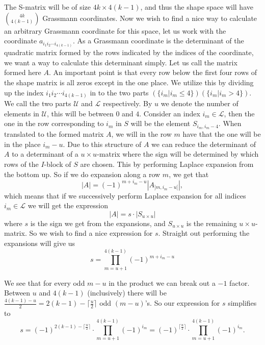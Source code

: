 \documentclass[a4paper,12pt]{book}
\theoremstyle{plain}
\theoremstyle{definition}
\begin{document}
The S-matrix will be of size \( 4k \times 4(k-1) \), and thus the shape space
will have  \( {4k \choose 4(k-1)} \) Grassmann coordinates. Now we wish to
find a nice way to calculate an arbitrary Grassmann coordinate for this space,
let us work with the coordinate \( a_{i_1 i_2 \cdots i_{4(k-1)}} \). As a
Grassmann coordinate is the determinant of the quadratic matrix formed by the
rows indicated by the  indices of the coordinate, we want a way to calculate
this determinant simply. Let us call the matrix formed  here \( A \). An
important point is that every row below the first four rows of the shape
matrix is all zeros except in the one place.
We utilize this by dividing up the index \( i_1 i_2 \cdots i_{4(k-1)} \) in to
the two parts \( (\{i_m | i_m \leq 4\})(\{i_m | i_m > 4\}) \). We call the two
parts \( \mathcal{U} \) and \( \mathcal{L} \) respectively. By \( u \) we
denote the number of elements in \( \mathcal{U} \), this will be between \( 0
\) and \( 4 \).
Consider an index \( i_m \in \mathcal{L} \), then the one in the row
corresponding to \( i_m \) in \( S \) will be the element \( S_{i_m, i_m - 4}
\). When translated to the formed matrix \( A \), we will in the row \( m \)
have that the one will be in the place \( i_m - u\). Due to this structure of
\( A \) we can reduce the determinant of \( A \) to a determinant of a \( u
\times u \)-matrix where the sign will be determined by which rows of the \( I
\)-block of \( S \) are chosen. This by performing Laplace expansion from the
bottom up. So if we do expansion along a row \( m \), we get that
\[
	|A| = (-1)^{m + i_m - u}|A_{]m, i_m - u[}|,
\]
which means that if we successively perform Laplace expansion for all indices
\( i_m \in \mathcal{L} \) we will get the expression
\[
	|A| = s \cdot |S_{u \times u}|
\]
where \( s \) is the sign we get from the expansions,
and \( S_{u \times u} \) is the remaining \( u \times u \)-matrix.
So we wish to find a nice expression for \( s \).
Straight out performing the expansions will give us
\[
	s = \prod_{m = u + 1}^{4(k-1)} (-1)^{m + i_m - u}
\]

We see that for every odd \( m - u \) in the product we can break out a \( -1
\) factor. Between \( u \) and \( 4(k-1) \) (inclusively) there will be \(
\frac{4(k-1) - u}{2} = 2(k-1) - \lceil \frac{u}{2} \rceil \) odd \( (m - u)
\)'s. So our expression for \( s \) simplifies to
\[
	s = (-1)^{2(k-1) - \lceil \frac{u}{2} \rceil} \cdot \prod_{m = u + 1}^{4(k-1)} (-1)^{i_m} =
	(-1)^{\lceil \frac{u}{2} \rceil} \cdot \prod_{m = u + 1}^{4(k-1)} (-1)^{i_m} .
\]
\end{document}
